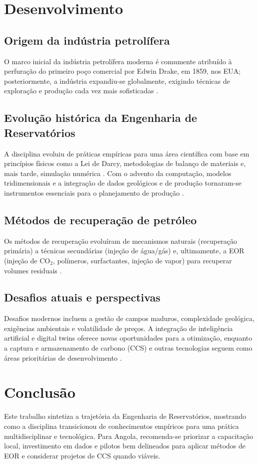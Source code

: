 \documentclass[12pt,a4paper,oneside,brazilian,sumario=tradicional]{abntex2}
\begin{document}
\chapter{Desenvolvimento}
\section{Origem da indústria petrolífera}
O marco inicial da indústria petrolífera moderna é comumente atribuído à
perfuração do primeiro poço comercial por Edwin Drake, em 1859, nos EUA;
posteriormente, a indústria expandiu-se globalmente, exigindo técnicas de
exploração e produção cada vez mais sofisticadas \cite{yergin1991}.

\section{Evolução histórica da Engenharia de Reservatórios}
A disciplina evoluiu de práticas empíricas para uma área científica com base
em princípios físicos como a Lei de Darcy, metodologias de balanço de
materiais e, mais tarde, simulação numérica \cite{muskat1949,dake1994,peaceman1977}.
Com o advento da computação, modelos tridimensionais e a integração de
dados geológicos e de produção tornaram-se instrumentos essenciais
para o planejamento de produção \cite{peaceman1977,aziz1979}.

\section{Métodos de recuperação de petróleo}
Os métodos de recuperação evoluíram de mecanismos naturais (recuperação
primária) a técnicas secundárias (injeção de água/gás) e, ultimamente, a
EOR (injeção de CO$_2$, polímeros, surfactantes, injeção de vapor) para
recuperar volumes residuais \cite{lake2007,craft1991}.

\section{Desafios atuais e perspectivas}
Desafios modernos incluem a gestão de campos maduros, complexidade
geológica, exigências ambientais e volatilidade de preços. A integração de
inteligência artificial e digital twins oferece novas oportunidades para a
otimização, enquanto a captura e armazenamento de carbono (CCS) e outras
tecnologias seguem como áreas prioritárias de desenvolvimento \cite{mungan2019,bachu2000}.

\chapter{Conclusão}
Este trabalho sintetiza a trajetória da Engenharia de Reservatórios, mostrando
como a disciplina transicionou de conhecimentos empíricos para uma prática
multidisciplinar e tecnológica. Para Angola, recomenda-se priorizar a
capacitação local, investimento em dados e pilotos bem delineados para
aplicar métodos de EOR e considerar projetos de CCS quando viáveis.

\postextual
\nocite{*}


\end{document}
